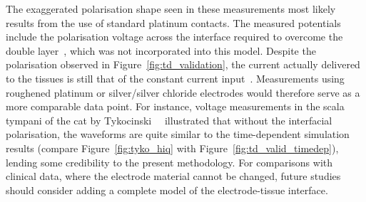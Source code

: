The exaggerated polarisation shape seen in these \invivo{} measurements most
likely results from the use of standard platinum contacts. The measured
potentials include the polarisation voltage across the interface required to
overcome the double layer~\cite{grimnes2000,tykocinski2001}, which was not
incorporated into this model. Despite the polarisation observed in
Figure~\ref{fig:td_validation}, the current actually delivered to the tissues is
still that of the constant current input~\cite{grimnes2000}. Measurements using
roughened platinum or silver/silver chloride electrodes would therefore serve as
a more comparable data point. For instance, voltage measurements in the scala
tympani of the cat by Tykocinski~\etal{}~\cite{tykocinski2001} illustrated that
without the interfacial polarisation, the waveforms are quite similar to the
time-dependent simulation results (compare Figure~\ref{fig:tyko_hiq} with
Figure~\ref{fig:td_valid_timedep}), lending some credibility to the present
methodology. For comparisons with clinical data, where the electrode material
cannot be changed, future studies should consider adding a complete model of the
electrode-tissue interface.

